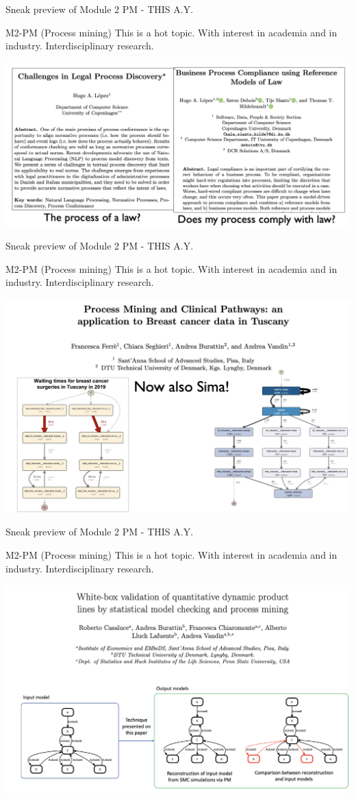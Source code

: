 \documentclass{beamer}%
\begin{document}
\begin{frame}{Sneak preview of Module 2  PM - THIS A.Y.}
	\centering 
	\begin{block}{M2-PM (Process mining)}
		This is a hot topic. With interest in academia and in industry. Interdisciplinary research.	
	\end{block}
	\includegraphics[width=0.8\linewidth]{figures/pm/law.png}
\end{frame}

\begin{frame}{Sneak preview of Module 2  PM - THIS A.Y.}
	\centering 
	\begin{block}{M2-PM (Process mining)}
		This is a hot topic. With interest in academia and in industry. Interdisciplinary research.	
	\end{block}
	\includegraphics[width=0.8\linewidth]{figures/pm/health.png}
\end{frame}

\begin{frame}{Sneak preview of Module 2  PM - THIS A.Y.}
	\centering 
	\begin{block}{M2-PM (Process mining)}
		This is a hot topic. With interest in academia and in industry. Interdisciplinary research.	
	\end{block}
	\includegraphics[width=0.8\linewidth]{figures/pm/smc.png}
\end{frame}
\end{document}

